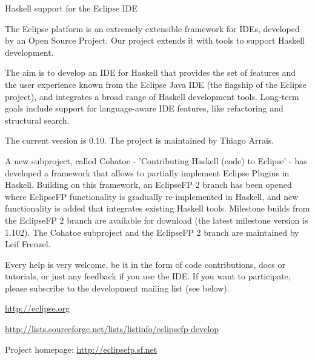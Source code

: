 \begin{hcarentry}[updated]{Haskell support for the Eclipse IDE}
\label{eclipsefp}
\makeheader

The Eclipse platform is an extremely extensible framework for IDEs, developed 
by an Open Source Project. Our project extends it with tools to support Haskell
development.

The aim is to develop an IDE for Haskell that provides the set of features and
the user experience known from the Eclipse Java IDE (the flagship of the 
Eclipse project), and integrates a broad range of Haskell development tools. 
Long-term goals include support for language-aware IDE features, like 
refactoring and structural search.

The current version is 0.10. The project is maintained by Thiago Arrais.

A new subproject, called Cohatoe - 'Contributing Haskell (code) to Eclipse' - 
has developed a framework that allows to partially implement Eclipse Plugins
in Haskell. Building on this framework, an EclipseFP 2 branch has been opened
where EclipseFP functionality is gradually re-implemented in Haskell, and new
functionality is added that integrates existing Haskell tools. Milestone 
builds from the EclipseFP 2 branch are available for download (the latest 
milestone version is 1.102). The Cohatoe subproject and the EclipseFP 2 
branch are maintained by Leif Frenzel.

Every help is very welcome, be it in the form of code contributions, docs or 
tutorials, or just any feedback if you use the IDE. If you want to 
participate, please subscribe to the development mailing list (see below).

\FurtherReading
\begin{compactitem}
\item \url{http://eclipse.org}
\item \url{http://lists.sourceforge.net/lists/listinfo/eclipsefp-develop}
\item Project homepage: \url{http://eclipsefp.sf.net}
\end{compactitem}
\end{hcarentry}
